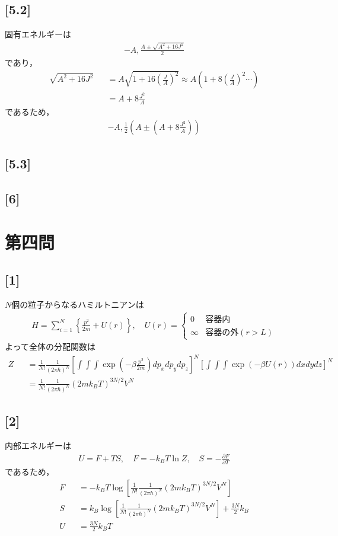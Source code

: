 \documentclass[12pt,dvipdfmx]{jsarticle}
\begin{document}
\subsection*{\large{[5.2]}}
固有エネルギーは
\begin{eqnarray}
  -A,\frac{A\pm \sqrt{A^2+16J^2}}{2} 
\end{eqnarray}
であり，
\begin{eqnarray}
  \sqrt{A^2+16J^2} &&= A\sqrt{ 1+16\left( \frac{J}{A} \right)^2 } \approx A\left( 1+8\left( \frac{J}{A} \right)^2 \cdots \right)\\
  &&= A+8\frac{J^2}{A}
\end{eqnarray}
であるため，
\begin{eqnarray}
  -A, \frac{1}{2}\left( A\pm \left(  A+8\frac{J^2}{A} \right) \right)
\end{eqnarray}
\subsection*{\large{[5.3]}}
\subsection*{\large{[6]}}
\newpage
\section*{\Large{第四問}}
\subsection*{\large{[1]}}

$N$個の粒子からなるハミルトニアンは
\begin{eqnarray}
  H = \sum_{i=1}^{N} \left\{ \frac{p^2}{2m} + U(r) \right\}, \quad U(r)=
  \begin{cases}
    0 & 容器内\\
    \infty & 容器の外(r>L)
  \end{cases}
\end{eqnarray}
よって全体の分配関数は
\begin{eqnarray}
  Z &&= \frac{1}{N!}\frac{1}{(2\pi\hbar)^N}\left[ \int\int\int \exp\left(-\beta\frac{p^2}{2m}\right)dp_x dp_y dp_z \right]^N \left[ \int\int\int \exp\left(-\beta U(r)\right)dx dydz \right]^N\\
  &&= \frac{1}{N!}\frac{1}{(2\pi\hbar)^N} (2mk_B T)^{3N/2} V^N
\end{eqnarray}
\subsection*{\large{[2]}}
内部エネルギーは
\begin{eqnarray}
  U = F+TS,\quad F = -k_BT\ln Z, \quad S=-\frac{\partial F}{\partial T}
\end{eqnarray}
であるため，
\begin{eqnarray}
  F &&= -k_BT \log\left[ \frac{1}{N!}\frac{1}{(2\pi\hbar)^N} (2mk_B T)^{3N/2} V^N\right]\\
  S &&= k_B\log\left[ \frac{1}{N!}\frac{1}{(2\pi\hbar)^N} (2mk_B T)^{3N/2} V^N\right]+ \frac{3N}{2}k_B\\
  U &&= \frac{3N}{2}k_BT
\end{eqnarray}
\end{document}
